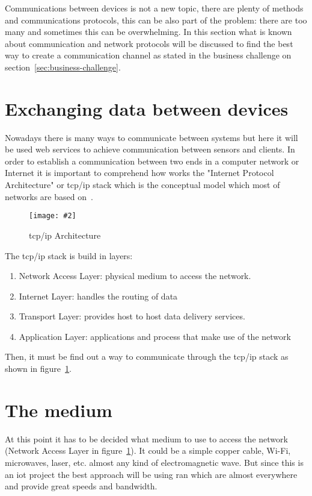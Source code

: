 \documentclass[hidelinks,11pt,a4paper,oneside,article]{memoir}
\newcommand{\putimage}[3][10] %
{
\begin{figure}[h]
	\centering
	\captionsetup{justification=centering}
	\texttt{[image: \#2]}
	\caption{#3}
	\label{fig:#2}
\end{figure}
}
\begin{document}
Communications between devices is not a new topic, there are plenty of methods and communications protocols, this can be also part of the problem: there are too many and sometimes this can be overwhelming. In this section what is known about communication and network protocols will be discussed to find the best way to create a communication channel as stated in the business challenge on section~\ref{sec:business-challenge}.



\section{Exchanging data between devices}
Nowadays there is many ways to communicate between systems but here it will be used web services to achieve communication between sensors and clients. In order to establish a communication between two ends in a computer network or Internet it is important to comprehend how works the "Internet Protocol Architecture" or \gls{tcp}/\gls{ip} stack which is the conceptual model which most of networks are based on~\cite[p.~9]{tcpip}.

	\putimage[5]{tcpip}{\gls{tcp}/\gls{ip} Architecture}

The \gls{tcp}/\gls{ip} stack is build in layers:
\begin{enumerate}
	\item Network Access Layer: physical medium to access the network.
	\item Internet Layer: handles the routing of data
	\item Transport Layer: provides host to host data delivery services.
	\item Application Layer: applications and process that make use of the network
\end{enumerate}
Then, it must be find out a way to communicate through the \gls{tcp}/\gls{ip} stack as shown in figure~\ref{fig:tcpip}.

\section{The medium}
At this point it has to be decided what medium to use to access the network (Network Access Layer in figure~\ref{fig:tcpip}). It could be a simple copper cable, Wi-Fi, microwaves, laser, etc. almost any kind of electromagnetic wave. But since this is an \gls{iot} project the best approach will be using \gls{ran} which are almost everywhere and provide great speeds and bandwidth.
\end{document}
